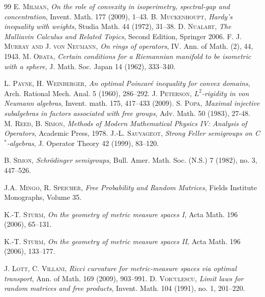 \documentclass[10pt,a4paper,reqno]{amsart}
\begin{document}
\begin{thebibliography}{99}
\textsc{E. Milman},
\textit{On the role of convexity in isoperimetry, spectral-gap and concentration},
Invent. Math. 177 (2009), 1–43.
\textsc{B. Muckenhoupt}, 
\textit{Hardy’s inequality with weights}, 
Studia Math. 44 (1972), 31–38.
\textsc{D. Nualart},
\textit{The Malliavin Calculus and Related Topics},
Second Edition, Springer 2006.
\textsc{F. J. Murray and J. von Neumann},
\textit{On rings of operators}, IV. Ann. of Math. (2), 44, 1943.
\textsc{M. Obata}, 
\textit{Certain conditions for a Riemannian manifold to be isometric with a sphere}, 
J. Math. Soc. Japan 14 (1962), 333–340.

\textsc{L. Payne, H. Weinberger}, 
\textit{An optimal Poincaré inequality for convex domains}, 
Arch. Rational Mech. Anal. 5 (1960), 286–292.
\textsc{J. Peterson},
\textit{$L^2$-rigidity in von Neumann algebras},
Invent. math. 175, 417–433 (2009).
\textsc{S. Popa},
\textit{Maximal injective subalgebras in factors associated with free groups}, Adv. Math.
50 (1983), 27-48.
\textsc{M. Reed, B. Simon}, 
\textit{Methods of Modern Mathematical Physics IV: Analysis of Operators}, 
Academic Press, 1978.
\textsc{J.-L. Sauvageot}, 
\textit{Strong Feller semigroups on C$^\ast$-algebras}, 
J. Operator Theory 42 (1999), 83–120.

\textsc{B. Simon}, 
\textit{Schrödinger semigroups}, 
Bull. Amer. Math. Soc. (N.S.) 7 (1982), no. 3, 447–526.

\textsc{J.A. Mingo, R. Speicher}, 
\textit{Free Probability and Random Matrices}, 
Fields Institute Monographs, Volume 35.


\textsc{K.-T. Sturm}, 
\textit{On the geometry of metric measure spaces I}, 
Acta Math. 196 (2006), 65–131.

\textsc{K.-T. Sturm}, 
\textit{On the geometry of metric measure spaces II}, 
Acta Math. 196 (2006), 133–177.

\textsc{J. Lott, C. Villani}, 
\textit{Ricci curvature for metric-measure spaces via optimal transport}, 
Ann. of Math. 169 (2009), 903–991.
\textsc{D. Voiculescu}, 
\textit{Limit laws for random matrices and free products}, 
Invent. Math. 104 (1991), no. 1, 201–220.


\end{thebibliography}
\end{document}
